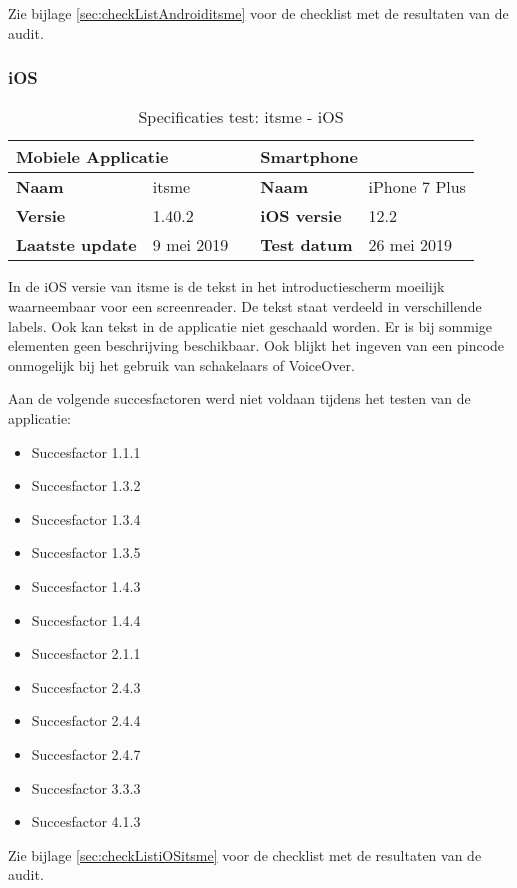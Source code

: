 Zie bijlage \ref{sec:checkListAndroiditsme} voor de checklist met de resultaten van de audit.

\subsubsection{iOS}

\begin{table} [H]
    \centering
    \caption{Specificaties test: itsme - iOS}
    \begin{tabular}{|l|l|l|l|l|} 
        \hline
        \multicolumn{2}{|l|}{\textbf{Mobiele Applicatie } } &  & \multicolumn{2}{l|}{\textbf{Smartphone }}  \\ 
        \hline
        \textbf{Naam}           & itsme                   &  & \textbf{Naam}           & iPhone 7 Plus         \\ 
        \hline
        \textbf{Versie}         & 1.40.2                     &  & \textbf{iOS versie} & 12.2           \\ 
        \hline
        \textbf{Laatste update} & 9 mei 2019               &  & \textbf{Test datum}     & 26 mei 2019      \\
        \hline
    \end{tabular}
\end{table}
In de iOS versie van itsme is de tekst in het introductiescherm moeilijk waarneembaar voor een screenreader. De tekst staat verdeeld in verschillende labels. Ook kan tekst in de applicatie niet geschaald worden. Er is bij sommige elementen geen beschrijving beschikbaar. Ook blijkt het ingeven van een pincode onmogelijk bij het gebruik van schakelaars of VoiceOver.


Aan de volgende succesfactoren werd niet voldaan tijdens het testen van de applicatie: \begin{itemize}
    \item Succesfactor 1.1.1
        \item Succesfactor 1.3.2
    \item Succesfactor 1.3.4
    \item Succesfactor 1.3.5
    \item Succesfactor 1.4.3
        \item Succesfactor 1.4.4
    \item Succesfactor 2.1.1
      \item Succesfactor 2.4.3
    \item Succesfactor 2.4.4
    \item Succesfactor 2.4.7
    \item Succesfactor 3.3.3
    \item Succesfactor 4.1.3
\end{itemize}
Zie bijlage \ref{sec:checkListiOSitsme} voor de checklist met de resultaten van de audit.
